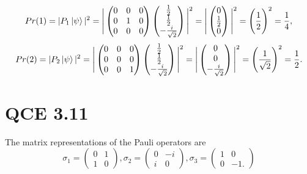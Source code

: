 \documentclass[10pt]{article}
\begin{document}
\[
Pr(1) = |P_1 \ket{\psi}|^2 = \Bigg| \begin{pmatrix}
0 & 0 & 0 \\
0 & 1 & 0 \\
0& 0 & 0 
\end{pmatrix} \begin{pmatrix}
\frac{1}{2} \\
\frac{1}{2} \\
-\frac{i}{\sqrt{2}}
\end{pmatrix} \Bigg|^2 = \Bigg| \begin{pmatrix}
0 \\
\frac{1}{2} \\
0 
\end{pmatrix} \Bigg|^2 = \Bigg( \frac{1}{2} \Bigg)^2 = \frac{1}{4},
\]
\[
Pr(2) = |P_2 \ket{\psi}|^2 = \Bigg| \begin{pmatrix}
0 & 0 & 0 \\
0 & 0 & 0 \\
0& 0 & 1 
\end{pmatrix} \begin{pmatrix}
\frac{1}{2} \\
\frac{1}{2} \\
-\frac{i}{\sqrt{2}}
\end{pmatrix} \Bigg|^2 = \Bigg| \begin{pmatrix}
0 \\
0 \\
-\frac{i}{\sqrt{2}}
\end{pmatrix} \Bigg|^2 = \Bigg( \frac{1}{\sqrt{2}} \Bigg)^2 = \frac{1}{2}.
\]

\section*{QCE 3.11}
The matrix representations of the Pauli operators are 
\[
\sigma_1 = \begin{pmatrix}
0 & 1 \\
1 & 0
\end{pmatrix},
\sigma_2 = \begin{pmatrix}
0 & -i \\
i & 0
\end{pmatrix}, 
\sigma_3 = \begin{pmatrix}
1 & 0 \\
0 & -1.
\end{pmatrix}
\]
\end{document}
